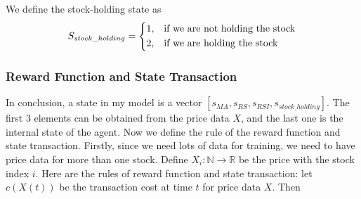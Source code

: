 \documentclass[11pt,a4paper]{article}
\numberwithin{equation}{section}
\newcommand{\R}{\mathbb{R}}
\newcommand{\N}{\mathbb{N}}
\begin{document}
We define the stock-holding state as
\begin{align}
  S_{stock\_holding} =
  \begin{dcases}
    1, & \text{if we are not holding the stock} \\
    2, & \text{if we are holding the stock}     \\
  \end{dcases}
\end{align}

\subsubsection{Reward Function and State Transaction}

In conclusion, a state in my model is a vector $[s_{MA}, s_{RS}, s_{RSI}, s_{stock\_holding}]$. The first 3 elements can be obtained from the price data $X$, and the last one is the internal state of the agent. Now we define the rule of the reward function and state transaction. Firstly, since we need lots of data for training, we need to have price data for more than one stock. Define $X_i: \N \to \R$ be the price with the stock index $i$. Here are the rules of reward function and state transaction: let $c(X(t))$ be the transaction cost at time $t$ for price data $X$. Then
\end{document}
